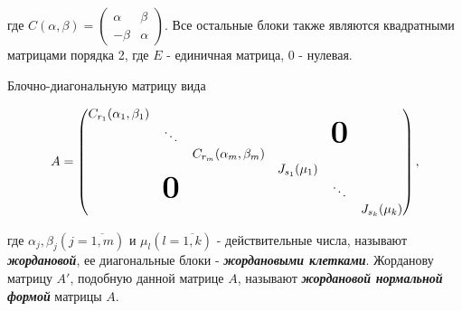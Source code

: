 где $C(\alpha, \beta) = \begin{pmatrix} 
    \alpha & \beta \\
    -\beta & \alpha
\end{pmatrix}$. Все остальные блоки также являются квадратными матрицами порядка 2, где $E$ - единичная матрица, 0 - нулевая.

Блочно-диагональную матрицу вида

\[
A = \begin{pmatrix}
    C_{r_1}(\alpha_1, \beta_1) &        &        &        &  \\
                               & \ddots &        &        & \text{\Huge \textbf{0}}   \\
                               &        & C_{r_m}(\alpha_m, \beta_m) &        &   \\
                               &        &        & J_{s_1}(\mu_1) &   \\
                               & \text{\Huge \textbf{0}} &        &     & \ddots  &  \\
                               &        &        &        & &J_{s_k}(\mu_k)
\end{pmatrix},
\]

где $\alpha_j, \beta_j (j = \overline{1, m})$ и $\mu_l (l = \overline{1, k})$ - действительные числа, называют \textbf{\textit{жордановой}}, ее диагональные блоки - \textbf{\textit{жордановыми клетками}}. Жорданову матрицу $A'$, подобную данной матрице $A$, называют \textbf{\textit{жордановой нормальной формой}} матрицы $A$.
